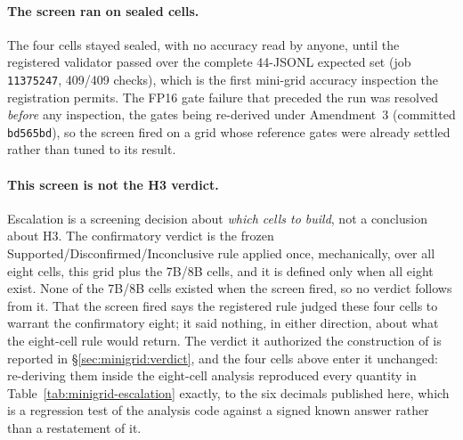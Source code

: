 \paragraph{The screen ran on sealed cells.}
The four cells stayed sealed, with no accuracy read by anyone, until the registered
validator passed over the complete 44-JSONL expected set (job \texttt{11375247},
409/409 checks), which is the first mini-grid accuracy inspection the
registration permits. The FP16 gate failure that preceded the run was resolved
\emph{before} any inspection, the gates being re-derived under Amendment~3
(committed \texttt{bd565bd}), so the screen fired on a grid whose reference
gates were already settled rather than tuned to its result.

\paragraph{This screen is not the H3 verdict.}
Escalation is a screening decision about \emph{which cells to build}, not a
conclusion about H3. The confirmatory verdict is the frozen
Supported/Disconfirmed/Inconclusive rule applied once, mechanically, over all
eight cells, this grid plus the 7B/8B cells, and it is defined only when all
eight exist. None of the 7B/8B cells existed when the screen fired, so no verdict
follows from it. That the screen fired says the registered rule judged these four
cells to warrant the confirmatory eight; it said nothing, in either direction,
about what the eight-cell rule would return. The verdict it authorized the
construction of is reported in \S\ref{sec:minigrid:verdict}, and the four cells
above enter it unchanged: re-deriving them inside the eight-cell analysis
reproduced every quantity in Table~\ref{tab:minigrid-escalation} exactly, to the
six decimals published here, which is a regression test of the analysis code
against a signed known answer rather than a restatement of it.

